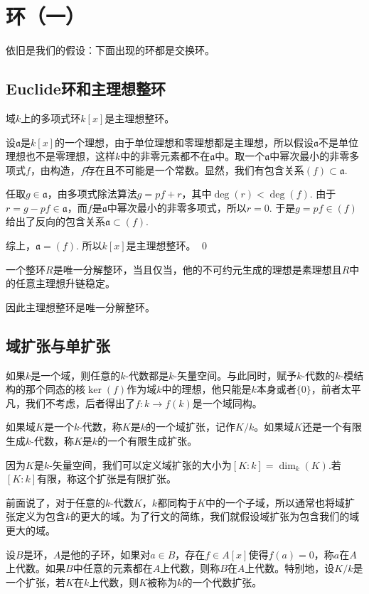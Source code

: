 \renewcommand\chapterimg{../Pictures/12.png}
\chapter{环（一）}
依旧是我们的假设：下面出现的环都是交换环。

\section{Euclide环和主理想整环}

\para 域$k$上的多项式环$k[x]$是主理想整环。

\proof
	设$\mathfrak{a}$是$k[x]$的一个理想，由于单位理想和零理想都是主理想，所以假设$\mathfrak{a}$不是单位理想也不是零理想，这样$k$中的非零元素都不在$\mathfrak{a}$中。取一个$\mathfrak{a}$中幂次最小的非零多项式$f$，由构造，$f$存在且不可能是一个常数。显然，我们有包含关系$(f)\subset \mathfrak{a}$.

	任取$g\in \mathfrak{a}$，由多项式除法算法$g=pf+r$，其中$\deg(r)<\deg(f)$. 由于$r=g-pf\in \mathfrak{a}$，而$f$是$\mathfrak{a}$中幂次最小的非零多项式，所以$r=0$. 于是$g=pf\in (f)$给出了反向的包含关系$\mathfrak{a}\subset (f)$.

	综上，$\mathfrak{a}=(f)$. 所以$k[x]$是主理想整环。
\qed

\pro 一个整环$R$是唯一分解整环，当且仅当，他的不可约元生成的理想是素理想且$R$中的任意主理想升链稳定。

\para 因此主理想整环是唯一分解整环。

\section{域扩张与单扩张}

如果$k$是一个域，则任意的$k$-代数都是$k$-矢量空间。与此同时，赋予$k$-代数的$k$-模结构的那个同态的核$\ker(f)$作为域$k$中的理想，他只能是$k$本身或者$\{0\}$，前者太平凡，我们不考虑，后者得出了$f:k\to f(k)$是一个域同构。

\para 如果域$K$是一个$k$-代数，称$K$是$k$的一个域扩张，记作$K/k$。如果域$K$还是一个有限生成$k$-代数，称$K$是$k$的一个有限生成扩张。

因为$K$是$k$-矢量空间，我们可以定义域扩张的大小为$[K:k]=\dim_k(K)$.若$[K:k]$有限，称这个扩张是有限扩张。

前面说了，对于任意的$k$-代数$K$，$k$都同构于$K$中的一个子域，所以通常也将域扩张定义为包含$k$的更大的域。为了行文的简练，我们就假设域扩张为包含我们的域更大的域。

\para 设$B$是环，$A$是他的子环，如果对$a\in B$，存在$f\in A[x]$使得$f(a)=0$，称$a$在$A$上代数。如果$B$中任意的元素都在$A$上代数，则称$B$在$A$上代数。特别地，设$K/k$是一个扩张，若$K$在$k$上代数，则$K$被称为$k$的一个代数扩张。

